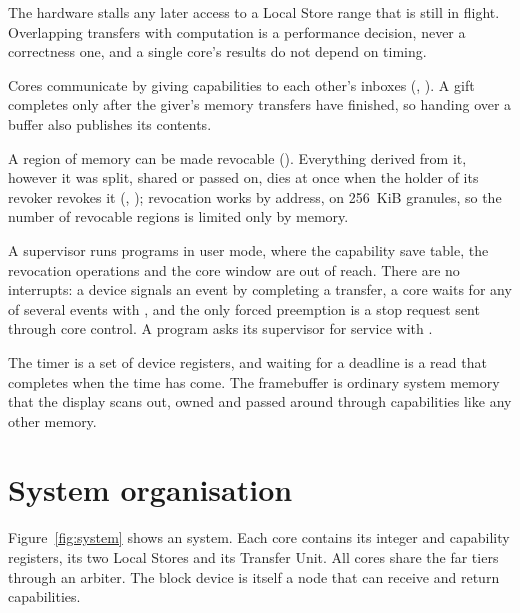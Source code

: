 \begin{description}[leftmargin=1em,style=nextline]
  The hardware stalls any later access to a Local Store range that is still in flight. Overlapping
  transfers with computation is a performance decision, never a correctness one, and a single core's
  results do not depend on timing.
\item[Ownership transfer is synchronisation.] Cores communicate by giving capabilities to each other's
  inboxes (, ). A gift completes only after the giver's memory transfers have
  finished, so handing over a buffer also publishes its contents.
\item[Authority can be lent and taken back.] A region of memory can be made revocable
  (). Everything derived from it, however it was split, shared or passed on, dies at once when
  the holder of its revoker revokes it (, ); revocation works by address, on
  256~KiB granules, so the number of revocable regions is limited only by memory.
\item[Two privilege modes, no interrupts.] A supervisor runs programs in user mode, where the
  capability save table, the revocation operations and the core window are out of reach. There are no
  interrupts: a device signals an event by completing a transfer, a core waits for any of several events
  with , and the only forced preemption is a stop request sent through core control. A program
  asks its supervisor for service with .
\item[Time and pictures are devices like any other.] The timer is a set of device registers, and waiting
  for a deadline is a read that completes when the time has come. The framebuffer is ordinary system
  memory that the display scans out, owned and passed around through capabilities like any other
  memory.
\end{description}

\section{System organisation}

Figure~\ref{fig:system} shows an \IS system. Each core contains its integer and capability registers,
its two Local Stores and its Transfer Unit. All cores share the far tiers through an arbiter. The block
device is itself a node that can receive and return capabilities.

